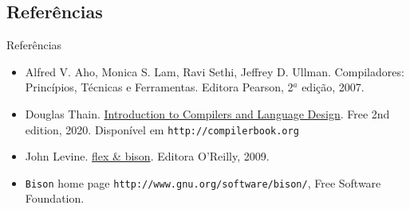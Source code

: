 \subsection*{Referências}

\begin{frame}{Referências}

  \begin{itemize}
  \item Alfred V. Aho, Monica S. Lam, Ravi Sethi, Jeffrey D. Ullman.
    Compiladores: Princípios, Técnicas e Ferramentas. Editora
    Pearson, 2$^a$ edição, 2007.

  \item Douglas Thain. \href{http://compilerbook.org}{Introduction to
      Compilers and Language Design}. Free 2nd edition, 2020.
    Disponível em {\tt http://compilerbook.org}

  \item John Levine.
    \href{https://www.oreilly.com/library/view/flex-bison/9780596805418/}{flex
      \& bison}. Editora O'Reilly, 2009.

  \item {\tt Bison} home page {\tt http://www.gnu.org/software/bison/}, Free
    Software Foundation.
  \end{itemize}
 \end{frame}
